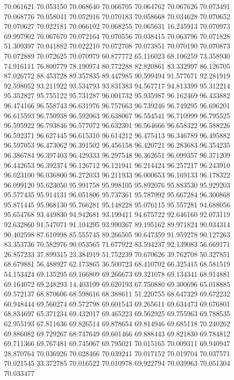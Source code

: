 70.061621
70.053150
70.068640
70.066705
70.064762
70.067626
70.073491
70.068776
70.058041
70.052916
70.070183
70.058668
70.034628
70.070652
70.070627
70.022181
70.066102
70.068255
70.065631
16.245913
70.070973
69.997902
70.067670
70.072164
70.070556
70.038415
70.063796
70.071828
51.309397
70.041882
70.022210
70.072708
70.073851
70.070190
70.070873
70.072889
70.072625
70.070979
60.877772
65.116023
68.106259
73.358930
74.916111
76.800779
78.190974
80.772288
82.820861
83.332997
86.126705
87.026772
88.453728
89.357835
89.447985
90.599494
91.577671
92.281919
92.598052
93.211922
93.534793
93.831383
94.567717
94.813399
95.312214
95.352827
95.755122
95.731287
96.001732
95.935987
96.162469
96.433882
96.474166
96.558743
96.631976
96.757663
96.739246
96.749295
96.696201
96.615593
96.750938
96.592063
96.638067
96.554541
96.710999
96.795525
96.595922
96.793846
96.577072
96.632301
96.564666
96.658322
96.588226
96.592371
96.627445
96.615310
96.614212
96.475413
96.346789
96.495882
96.597053
96.473062
96.391502
96.456158
96.420721
96.283683
96.354235
96.386784
96.397403
96.429333
96.297548
96.362651
96.099357
96.371209
96.442653
96.392374
96.126712
96.121941
96.214424
96.257217
96.243910
96.023100
96.036800
96.272033
96.211933
96.000653
96.169133
96.178322
96.099120
95.623050
95.991758
95.998105
95.892076
95.883530
95.929203
95.577435
95.914131
96.051806
95.737361
95.787992
95.667284
96.300868
95.871445
95.968130
95.766281
95.148228
95.076115
95.557281
94.688056
95.654768
93.449830
94.942681
93.199411
94.675722
92.646160
92.073119
92.632860
91.547071
91.104295
93.990367
89.195162
89.971824
90.034314
90.402598
87.610998
85.555745
89.266505
90.647359
91.959278
90.127263
83.353736
70.582976
90.053565
71.677922
83.594237
92.139083
56.669171
26.857233
37.899315
23.384919
51.752239
70.670626
39.762708
50.327851
68.679881
56.488927
62.173865
36.500723
68.410702
66.325415
68.581519
54.153424
69.135295
69.166809
69.266673
69.321078
69.134341
68.914881
69.164072
69.248293
14.403109
69.620193
67.750880
69.300696
65.018885
69.572137
68.870606
68.598616
68.388611
51.220755
68.647329
69.672232
60.948444
69.560274
69.572798
69.601543
69.265611
69.634473
69.676801
68.834697
65.371234
69.432017
69.465223
69.562925
69.755963
69.788535
62.955193
67.811636
69.826514
69.878654
69.814946
69.685118
70.240262
69.886082
69.729267
68.747649
69.601466
69.888443
69.821830
69.784812
69.711366
69.767481
69.745067
69.795021
70.015165
70.009311
69.940947
28.870764
70.036926
70.028466
70.039241
70.017152
70.019704
70.037571
70.021545
33.372785
70.016522
70.010978
69.922794
70.039963
70.051304
70.033477
